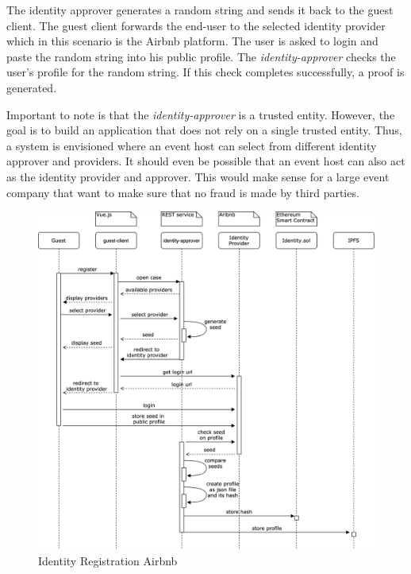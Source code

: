 The identity approver generates a random string and sends it back to the guest client. The guest client forwards the end-user to the selected identity provider which in this scenario is the Airbnb platform. The user is asked to login and paste the random string into his public profile. The \textit{identity-approver} checks the user's profile for the random string. If this check completes successfully, a proof is generated.

Important to note is that the \textit{identity-approver} is a trusted entity. However, the goal is to build an application that does not rely on a single trusted entity. Thus, a system is envisioned where an event host can select from different identity approver and providers. It should even be possible that an event host can also act as the identity provider and approver. This would make sense for a large event company that want to make sure that no fraud is made by third parties. 

\begin{figure}[H]
    \centering
    \includegraphics[width=16cm]{design/diagrams/identy-registration-airbnb.png}
    \caption{Identity Registration Airbnb}
    \label{fig:identity-registration-airbnb}
\end{figure}

